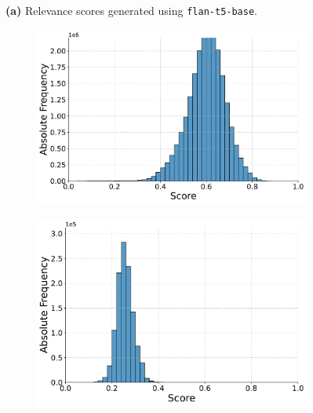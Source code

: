 \begin{figure}[t!]
    \vspace{-0.5cm}
    \textbf{(a)} Relevance scores generated using \texttt{flan-t5-base}.
    \vspace{0.5cm}

    \begin{subfigure}[b]{0.49\textwidth}
        \centering
        \includegraphics[width=\textwidth]{graphics/seaborn/pairwise_self_score_distribution_flan-t5-small.pdf}
        \label{fig:pairwise_flan-t5-small}
    \end{subfigure}
    \hfill
    \begin{subfigure}[b]{0.49\textwidth}
        \centering
        \includegraphics[width=\textwidth]{graphics/seaborn/pointwise_self_score_distribution_flan-t5-small.pdf}
        \label{fig:pointwise_flan-t5-small}
    \end{subfigure}


\end{figure}

